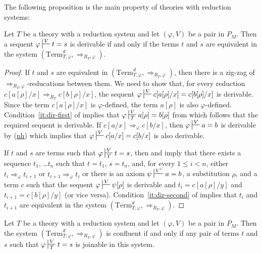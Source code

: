 \documentclass[reqno]{amsart}
\newcommand{\axref}[1]{(\hyperref[ax:#1]{#1})}
\theoremstyle{definition}
\theoremstyle{remark}
\newcommand{\Term}{\mathrm{Term}}
\numberwithin{figure}{section}
\begin{document}
The following proposition is the main property of theories with reduction systems:

\begin{prop}
Let $T$ be a theory with a reduction system and let $(\varphi,V)$ be a pair in $P_M$.
Then a sequent $\varphi \sststile{}{V} t = s$ is derivable if and only if the terms $t$ and $s$ are equivalent in the system $(\Term_{T,\varphi}^d,\Rightarrow_{R_T,\varphi})$.
\end{prop}
\begin{proof}
If $t$ and $s$ are equivalent in $(\Term_{T,\varphi}^d,\Rightarrow_{R_T,\varphi})$, then there is a zig-zag of $\Rightarrow_{R_T,\varphi}$-reducations between them.
We need to show that, for every reduction $c[a[\rho]/x] \Rightarrow_{R_T} c[b[\rho]/x]$, the sequent $\varphi \sststile{}{V} c[a[\rho]/x] = c[b[\rho]/x]$ is derivable.
Since the term $c[a[\rho]/x]$ is $\varphi$-defined, the term $a[\rho]$ is also $\varphi$-defined.
Condition~\eqref{it:dir-first} of  implies that $\varphi \sststile{T}{V} a[\rho] = b[\rho]$ from which follows that the required sequent is derivable.
If $c[a/x] \Rightarrow_\varphi c[b/x]$, then $\varphi \sststile{}{V} a = b$ is derivable by \axref{nh} which implies that $\varphi \sststile{}{V} c[a/x] = c[b/x]$ is also derivable.

If $t$ and $s$ are terms such that $\varphi \sststile{T}{V} t = s$, then  and  imply that there exists a sequence $t_1$, \ldots $t_n$ such that $t = t_1$, $s = t_n$, and, for every $1 \leq i < n$,
either $t_i \Rightarrow_\varphi t_{i+1}$ or $t_{i+1} \Rightarrow_\varphi t_i$ or there is an axiom $\psi \sststile{}{V'} a = b$, a substitution $\rho$, and a term $c$ such that
the sequent $\varphi \sststile{}{V} \psi[\rho]$ is derivable and $t_i = c[a[\rho]/y]$ and $t_{i+1} = c[b[\rho]/y]$ (or vice versa).
Condition~\eqref{it:dir-second} of  implies that $t_i$ and $t_{i+1}$ are equivalent in the system $(\Term_{T,\varphi}^d,\Rightarrow_{R_T,\varphi})$.
\end{proof}

\begin{cor}
Let $T$ be a theory with a reduction system and let $(\varphi,V)$ be a pair in $P_M$.
Then the system $(\Term_{T,\varphi}^d,\Rightarrow_{R_T,\varphi})$ is confluent if and only if any pair of terms $t$ and $s$ such that $\varphi \sststile{T}{V} t = s$ is joinable in this system.
\end{cor}
\end{document}
